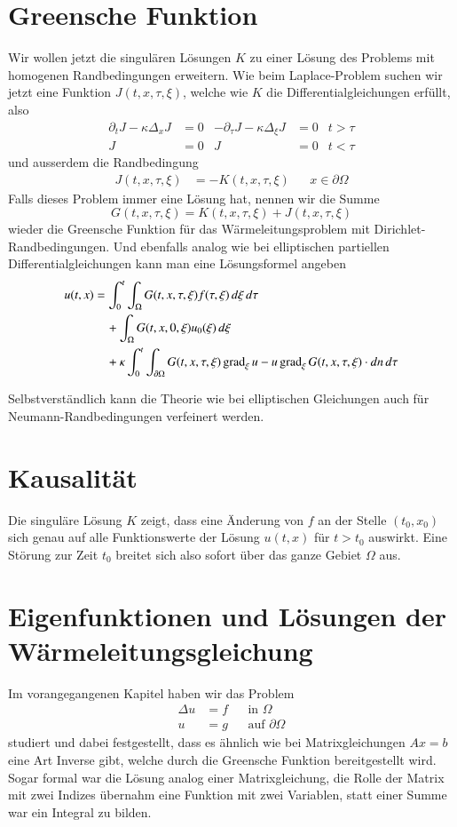 \section{Greensche Funktion}
Wir wollen jetzt die singulären Lösungen $K$ zu einer Lösung des Problems
mit homogenen Randbedingungen erweitern.
Wie beim Laplace-Problem suchen wir jetzt eine Funktion $J(t,x,\tau,\xi)$,
welche wie $K$ die Differentialgleichungen erfüllt, also
\begin{align*}
\partial_t J-\kappa\Delta_xJ&=0
&
-\partial_\tau J-\kappa\Delta_\xi J&=0
&t>\tau
\\
J&=0&J&=0&t<\tau
\end{align*}
und ausserdem die Randbedingung 
\begin{align*}
J(t,x,\tau,\xi)&=-K(t,x,\tau,\xi)&&x\in\partial\Omega
\end{align*}
Falls dieses Problem immer eine Lösung hat, nennen wir die
Summe
\[
G(t,x,\tau,\xi)=K(t,x,\tau,\xi)+J(t,x,\tau,\xi)
\]
wieder die Greensche Funktion für das Wärmeleitungsproblem
mit Dirichlet-Rand\-bedingungen. Und ebenfalls analog wie bei elliptischen
partiellen Differentialgleichungen kann man eine Lösungsformel
angeben
\begin{align}
u(t,x)&=
\int_0^t\int_{\Omega}G(t,x,\tau,\xi)f(\tau,\xi)\,d\xi\,d\tau
\notag
\\
&\quad+\int_{\Omega}G(t,x,0,\xi)u_0(\xi)\,d\xi
\notag
\\
&\quad +\kappa\int_0^t\int_{\partial \Omega}
G(t,x,\tau,\xi)\operatorname{grad}_\xi u
-u\operatorname{grad}_\xi G(t,x,\tau,\xi)\cdot dn\,d\tau
\label{green-parabolisch}
\end{align}

Selbstverständlich kann die Theorie wie bei elliptischen Gleichungen
auch für Neumann-Randbedingungen verfeinert werden.

\section{Kausalität}
Die singuläre Lösung $K$ zeigt, dass eine Änderung von $f$ an der Stelle
$(t_0,x_0)$ sich genau auf alle Funktionswerte der Lösung $u(t,x)$ für
$t>t_0$ auswirkt. Eine Störung zur Zeit $t_0$ breitet sich also sofort
über das ganze Gebiet $\Omega$ aus.

\section{Eigenfunktionen und Lösungen der Wärmeleitungsgleichung}
Im vorangegangenen Kapitel haben wir das Problem
\begin{align*}
\Delta u&=f&&\text{in $\Omega$}\\
u&=g&&\text{auf $\partial\Omega$}
\end{align*}
studiert und dabei festgestellt, dass es ähnlich wie bei Matrixgleichungen
$Ax=b$ eine Art Inverse gibt, welche durch die Greensche Funktion
bereitgestellt wird. Sogar formal war die Lösung analog einer Matrixgleichung,
die Rolle der Matrix mit zwei Indizes übernahm eine Funktion mit zwei
Variablen, statt einer Summe war ein Integral zu bilden.

